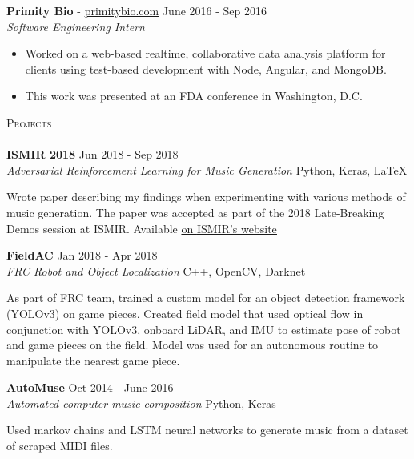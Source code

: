 \documentclass[a4paper]{article}
\newcommand{\lineunder} {
    \vspace*{-8pt} \\
    \hspace*{-18pt} \hrulefill \\
}
\newcommand{\header} [1] {
    {\hspace*{-18pt}\vspace*{6pt} \textsc{#1}}
    \vspace*{-6pt} \lineunder
}
\begin{document}
\noindent
\textbf{Primity Bio} - \url{primitybio.com} \hfill June 2016 - Sep 2016\\
\textit{Software Engineering Intern} \\
\vspace{-6mm}
\begin{itemize} \itemsep 0.1pt
	\item Worked on a web-based realtime, collaborative data analysis platform for clients using test-based development with Node, Angular, and MongoDB.
	\item This work was presented at an FDA conference in Washington, D.C.
\end{itemize}



\header{Projects}
\noindent
\textbf{ISMIR 2018} \hfill Jun 2018 - Sep 2018\\
\textit{Adversarial Reinforcement Learning for Music Generation} \hfill Python, Keras, \LaTeX\\
\vspace{-25pt}
\begin{paragraph}{}
Wrote paper describing my findings when experimenting with various methods of music generation. The paper was accepted as part of the 2018 Late-Breaking Demos session at ISMIR. Available \href{http://ismir2018.ircam.fr/pages/events-lbd.html}{on \underline{ISMIR's website}}\\
\end{paragraph}

\noindent
\textbf{FieldAC} \hfill Jan 2018 - Apr 2018\\
\textit{FRC Robot and Object Localization} \hfill C++, OpenCV, Darknet\\
\vspace{-25pt}
\begin{paragraph}{}
As part of FRC team, trained a custom model for an object detection framework (YOLOv3) on game pieces. Created field model that used optical flow in conjunction with YOLOv3, onboard LiDAR, and IMU to estimate pose of robot and game pieces on the field. Model was used for an autonomous routine to manipulate the nearest game piece.\\

\end{paragraph}
\noindent
\textbf{AutoMuse} \hfill Oct 2014 - June 2016\\
\textit{Automated computer music composition} \hfill Python, Keras
\vspace{-13pt}
\begin{paragraph}{}
Used markov chains and LSTM neural networks to generate music from a dataset of scraped MIDI files. \\ 

\end{paragraph}
\end{document}

